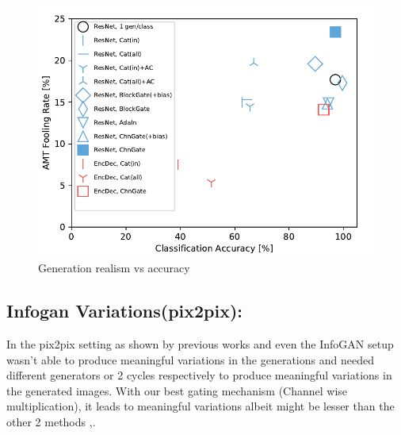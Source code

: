 \begin{figure}
    \centering
    \includegraphics[width=\linewidth]{paper_images/gen_real_vs_acc.pdf}
    \caption{Generation realism vs accuracy}\label{fig:conditioning_amt}
\end{figure}



\subsection{Infogan Variations(pix2pix):}
In the pix2pix setting as shown by previous works \cite{ghosh2017multi} and \cite{zhu2017toward} even the InfoGAN setup wasn't able to produce meaningful variations in the generations and needed different generators or 2 cycles respectively to produce meaningful variations in the generated images. With our best gating mechanism (Channel wise multiplication), it leads to meaningful variations albeit might be lesser than the other 2 methods \cite{ghosh2017multi} ,\cite{zhu2017toward}.

